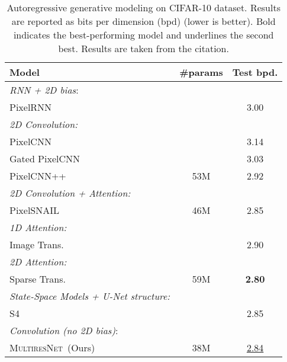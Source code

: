 \documentclass{article}
\theoremstyle{plain}
\theoremstyle{definition}
\theoremstyle{remark}
\newcommand{\ourmodel}{\textsc{MultiresNet}}
\begin{document}
\begin{table}[t]
    \centering
    \vspace{-0.08in}
    \caption{Autoregressive generative modeling on CIFAR-10 dataset. Results are reported as bits per dimension (bpd) (lower is better).  
        Bold indicates the best-performing model and underlines the second best. Results are taken from the citation.}
    \label{tab:ar-cifar}
        \setlength{\tabcolsep}{5pt}
        \vskip 0.1in
        \begin{small}
            \begin{tabular}{lcc}
                \toprule
                Model & \#params & Test bpd. \\
                \midrule
                \emph{RNN + 2D bias}: \\
                PixelRNN \citep{van2016pixel} &  & 3.00 \\
                \midrule
                \emph{2D Convolution:} \\
                PixelCNN \citep{van2016pixel} & & 3.14 \\
                Gated PixelCNN \citep{van2016conditional} &  & 3.03 \\
                PixelCNN++ \citep{salimans2017pixelcnn} & 53M  & 2.92 \\
                \midrule
                \emph{2D Convolution + Attention:} \\
                PixelSNAIL \citep{chen2018pixelsnail} & 46M & 2.85 \\
                \midrule
                \emph{1D Attention:} & & \\
                Image Trans. \citep{trinh2018learning} &  & 2.90 \\
                \emph{2D Attention:} & & \\
                Sparse Trans. \citep{child2019generating} & 59M  & \textbf{2.80} \\
                \midrule
                \emph{State-Space Models + U-Net structure:} & & \\
                S4 \citep{gu2021efficiently} &  & 2.85 \\
                \midrule
                \emph{Convolution (no 2D bias)}: \\
                \ourmodel~(Ours) & 38M &  \underline{2.84} \\
                \bottomrule
            \end{tabular}
        \end{small}\vspace{-0.1cm}
\end{table}
\end{document}
